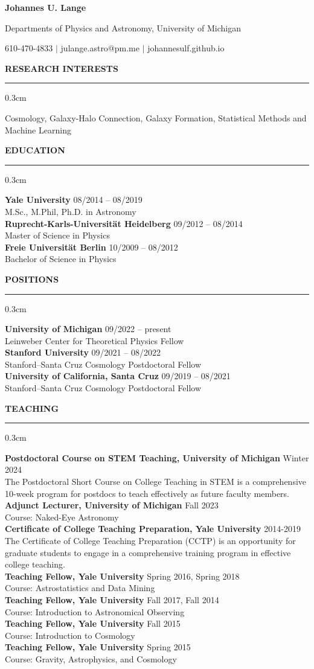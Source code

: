 \documentclass[12pt]{article}
\renewenvironment{section}[1]
  {
  \medskip
  {\color{yaleblue} \MakeUppercase{\bf #1}}
  \smallskip
  \hrule
  \medskip
  \begin{adjustwidth}{0.3cm}{}
  }
  {
  \end{adjustwidth}
  }
\newcommand{\entry}[3]{{\bf #1} \hfill {#2} \\ {#3}}
\begin{document}
\centerline{\color{yaleblue} \Huge \bf Johannes U. Lange}
\centerline{Departments of Physics and Astronomy, University of Michigan}
\centerline{610-470-4833 $\vert$ julange.astro@pm.me $\vert$ johannesulf.github.io}
\bigskip

\begin{section}{Research Interests}
  Cosmology, Galaxy-Halo Connection, Galaxy Formation, Statistical Methods and Machine Learning
\end{section}

\begin{section}{Education}
  \entry{Yale University}{08/2014 -- 08/2019}{M.Sc., M.Phil, Ph.D. in Astronomy} \medskip \\
  \entry{Ruprecht-Karls-Universität Heidelberg}{09/2012 -- 08/2014}{Master of Science in Physics} \medskip \\
  \entry{Freie Universität Berlin}{10/2009 -- 08/2012}{Bachelor of Science in Physics}
\end{section}

\begin{section}{Positions}
  \entry{University of Michigan}{09/2022 -- present}{Leinweber Center for Theoretical Physics Fellow} \medskip \\
  \entry{Stanford University}{09/2021 -- 08/2022}{Stanford--Santa Cruz Cosmology Postdoctoral Fellow} \medskip \\
  \entry{University of California, Santa Cruz}{09/2019 -- 08/2021}{Stanford--Santa Cruz Cosmology Postdoctoral Fellow}
\end{section}

\begin{section}{Teaching}
  \entry{Postdoctoral Course on STEM Teaching, University of Michigan}{Winter 2024}{The Postdoctoral Short Course on College Teaching in STEM is a comprehensive 10-week program for postdocs to teach effectively as future faculty members.} \medskip \\
  \entry{Adjunct Lecturer, University of Michigan}{Fall 2023}{Course: Naked-Eye Astronomy} \medskip \\
  \entry{Certificate of College Teaching Preparation, Yale University}{2014-2019}{The Certificate of College Teaching Preparation (CCTP) is an opportunity for graduate students to engage in a comprehensive training program in effective college teaching.} \medskip \\
  \entry{Teaching Fellow, Yale University}{Spring 2016, Spring 2018}{Course: Astrostatistics and Data Mining} \medskip \\
  \entry{Teaching Fellow, Yale University}{Fall 2017, Fall 2014}{Course: Introduction to Astronomical Observing} \medskip \\
  \entry{Teaching Fellow, Yale University}{Fall 2015}{Course: Introduction to Cosmology} \medskip \\
  \entry{Teaching Fellow, Yale University}{Spring 2015}{Course: Gravity, Astrophysics, and Cosmology}
\end{section}
\end{document}
